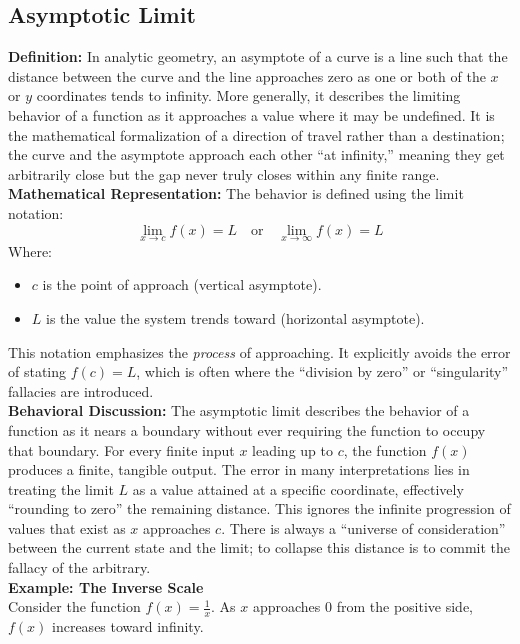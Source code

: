 \documentclass[twoside,twocolumn,9pt]{article}
\begin{document}
\subsection{Asymptotic Limit}
\textbf{Definition:}
In analytic geometry, an asymptote of a curve is a line such that the distance between the curve and the line approaches zero as one or both of the $x$ or $y$ coordinates tends to infinity. More generally, it describes the limiting behavior of a function as it approaches a value where it may be undefined. It is the mathematical formalization of a direction of travel rather than a destination; the curve and the asymptote approach each other ``at infinity,'' meaning they get arbitrarily close but the gap never truly closes within any finite range.\\

\noindent\textbf{Mathematical Representation:}
The behavior is defined using the limit notation:
\begin{equation}
\lim_{x \to c} f(x) = L \quad \text{or} \quad \lim_{x \to \infty} f(x) = L
\end{equation}
Where:
\begin{itemize}
    \item $c$ is the point of approach (vertical asymptote).
    \item $L$ is the value the system trends toward (horizontal asymptote).
\end{itemize}
This notation emphasizes the \textit{process} of approaching. It explicitly avoids the error of stating $f(c) = L$, which is often where the ``division by zero'' or ``singularity'' fallacies are introduced.\\

\noindent\textbf{Behavioral Discussion:}
The asymptotic limit describes the behavior of a function as it nears a boundary without ever requiring the function to occupy that boundary. For every finite input $x$ leading up to $c$, the function $f(x)$ produces a finite, tangible output. The error in many interpretations lies in treating the limit $L$ as a value attained at a specific coordinate, effectively ``rounding to zero'' the remaining distance. This ignores the infinite progression of values that exist as $x$ approaches $c$. There is always a ``universe of consideration'' between the current state and the limit; to collapse this distance is to commit the fallacy of the arbitrary.\\

\noindent\textbf{Example: The Inverse Scale}\\
Consider the function $f(x) = \frac{1}{x}$. As $x$ approaches $0$ from the positive side, $f(x)$ increases toward infinity.\\
\end{document}
